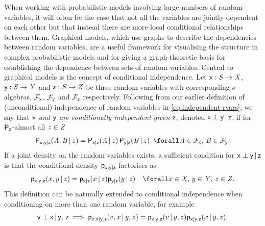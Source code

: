 When working with probabilistic models involving large numbers of random variables, it will often be the case that not all the variables are jointly dependent on each other but that instead there are more local conditional relationships between them. Graphical models, which use graphs to describe the dependencies between random variables, are a useful framework for visualising the structure in complex probabilistic models and for giving a graph-theoretic basis for establishing the dependence between sets of random variables. Central to graphical models is the concept of conditional independence. Let $\mathsf{x} : \mathit{S} \to \mathit{X}$, $\mathsf{y} : \mathit{S} \to \mathit{Y}$ and $\mathsf{z} : \mathit{S} \to \mathit{Z}$ be three random variables with corresponding $\sigma$-algebras, $\mathcal{F}_{\mathsf{x}}$, $\mathcal{F}_{\mathsf{y}}$ and $\mathcal{F}_{\mathsf{z}}$ respectively. Following from our earlier definition of (unconditional) independence of random variables in \eqref{eq:independent-rvars}, we say that \emph{$\mathsf{x}$ and $\mathsf{y}$ are conditionally independent given $\mathsf{z}$}, denoted $\mathsf{x} \perp \mathsf{y} \operatorname{|} \mathsf{z}$, if for $\mathsf{P}_{\mathsf{z}}$-almost all $z \in \mathit{Z}$
\begin{equation}\label{eq:conditional-independence-property}
  \prob{\rvar{x},\rvar{y}|\rvar{z}}(\set{A},\set{B} \gvn z) =
  \prob{\rvar{x}|\rvar{z}}(\set{A} \gvn z)\,
  \prob{\rvar{y}|\rvar{z}}(\set{B} \gvn z)
  ~\,\forall 
  \set{A} \in \sset{F}_{\rvar{x}},\,
  \set{B} \in \sset{F}_{\rvar{y}}.
\end{equation}
If a joint density on the random variables exists, a sufficient condition for $\mathsf{x} \perp \mathsf{y} \operatorname{|} \mathsf{z}$ is that the conditional density $\mathsf{p}_{\mathsf{x},\mathsf{y}|\mathsf{z}}$ factorises as
\begin{equation}\label{eq:conditional-independence-densities}
  \pden{\rvar{x},\rvar{y}|\rvar{z}}(x,y \gvn z) =
  \pden{\rvar{x}|\rvar{z}}(x \gvn z)
  \pden{\rvar{y}|\rvar{z}}(y \gvn z)
  \quad \forall 
  x \in \set{X},\,
  y \in \set{Y},\,
  z \in \set{Z}.
\end{equation}
This definition can be naturally extended to conditional independence when conditioning on more than one random variable, for example
\begin{equation}\label{eq:conditional-independence-many-vars}
  \mathsf{v} \perp \mathsf{x} \operatorname{|} \mathsf{y},\,\mathsf{z} \implies
  \mathsf{p}_{\mathsf{v},\mathsf{x}|\mathsf{y},\mathsf{z}}(v,x \operatorname{|} y,z) =
  \mathsf{p}_{\mathsf{v}|\mathsf{y},\mathsf{z}}(v \operatorname{|} y,z)
  \mathsf{p}_{\mathsf{x}|\mathsf{y},\mathsf{z}}(x \operatorname{|} y,z).
\end{equation}

